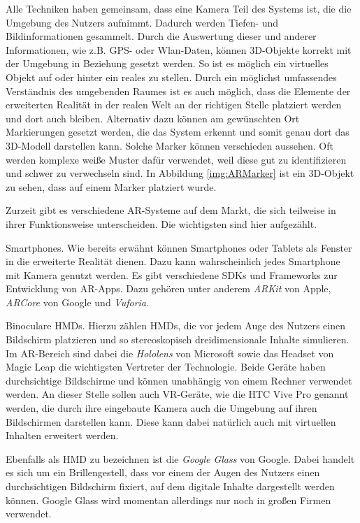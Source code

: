 Alle Techniken haben gemeinsam, dass eine Kamera Teil des Systems ist, die die Umgebung des Nutzers aufnimmt. Dadurch werden Tiefen- und Bildinformationen gesammelt. Durch die Auswertung dieser und anderer Informationen, wie z.B. GPS- oder Wlan-Daten, können 3D-Objekte korrekt mit der Umgebung in Beziehung gesetzt werden. So ist es möglich ein virtuelles Objekt auf oder hinter ein reales zu stellen. Durch ein möglichst umfassendes Verständnis des umgebenden Raumes ist es auch möglich, dass die Elemente der erweiterten Realität in der realen Welt an der richtigen Stelle platziert werden und dort auch bleiben.
Alternativ dazu können am gewünschten Ort Markierungen gesetzt werden, die das System erkennt und somit genau dort das 3D-Modell darstellen kann. Solche Marker können verschieden aussehen. Oft werden komplexe weiße Muster dafür verwendet, weil diese gut zu identifizieren und schwer zu verwechseln sind. In Abbildung \ref{img:ARMarker} ist ein 3D-Objekt zu sehen, dass auf einem Marker platziert wurde. 

Zurzeit gibt es verschiedene AR-Systeme auf dem Markt, die sich teilweise in ihrer Funktionsweise unterscheiden. Die wichtigsten sind hier aufgezählt.

Smartphones. Wie bereits erwähnt können Smartphones oder Tablets als Fenster in die erweiterte Realität dienen. Dazu kann wahrscheinlich jedes Smartphone mit Kamera genutzt werden. Es gibt verschiedene SDKs und Frameworks zur Entwicklung von AR-Apps. Dazu gehören unter anderem \textit{ARKit} von Apple, \textit{ARCore} von Google und \textit{Vuforia}.

Binoculare HMDs. Hierzu zählen HMDs, die vor jedem Auge des Nutzers einen Bildschirm platzieren und so stereoskopisch dreidimensionale Inhalte simulieren. Im AR-Bereich sind dabei die \textit{Hololens} von Microsoft sowie das Headset von Magic Leap die wichtigsten Vertreter der Technologie. Beide Geräte haben durchsichtige Bildschirme und können unabhängig von einem Rechner verwendet werden. 
An dieser Stelle sollen auch VR-Geräte, wie die HTC Vive Pro genannt werden, die durch ihre eingebaute Kamera auch die Umgebung auf ihren Bildschirmen darstellen kann. Diese kann dabei natürlich auch mit virtuellen Inhalten erweitert werden. 

Ebenfalls als HMD zu bezeichnen ist die \textit{Google Glass} von Google. Dabei handelt es sich um ein Brillengestell, dass vor einem der Augen des Nutzers einen durchsichtigen Bildschirm fixiert, auf dem digitale Inhalte dargestellt werden können. Google Glass wird momentan allerdings nur noch in großen Firmen verwendet.

